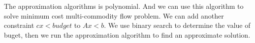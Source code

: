 \documentclass[a4paper]{article}
\begin{document}
The approximation algorithms is polynomial. And we can use this algorithm to solve minimum cost multi-commodity flow problem. We can add another constraint $cx<budget$ to $Ax<b$. We use binary search to determine the value of buget, then we run the approximation algorithm to find an approximate solution.








\end{document}
